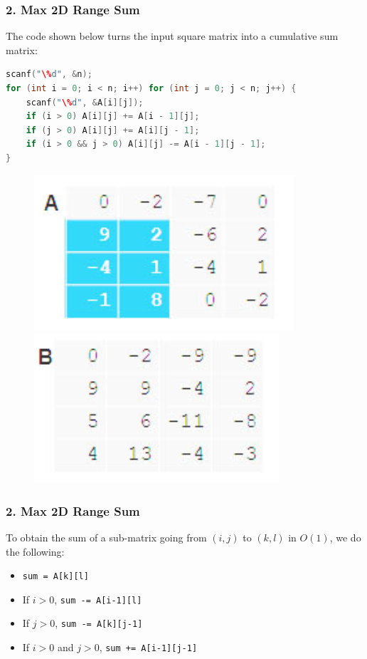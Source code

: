 \documentclass{beamer}
\begin{document}
\begin{frame}[fragile]
\frametitle{2. Max 2D Range Sum}

The code shown below turns the input square matrix into a cumulative sum matrix:

\vspace{0.3cm}

\begin{lstlisting}[language=c]
scanf("\%d", &n);
for (int i = 0; i < n; i++) for (int j = 0; j < n; j++) {
	scanf("\%d", &A[i][j]);
	if (i > 0) A[i][j] += A[i - 1][j];
	if (j > 0) A[i][j] += A[i][j - 1];
	if (i > 0 && j > 0) A[i][j] -= A[i - 1][j - 1];	
}\end{lstlisting}

\begin{figure}
    \centering
    \includegraphics[scale=0.6]{imgs/max2d_1.png}
    \hspace{0.5cm}
    \includegraphics[scale=0.6]{imgs/max2d_2.png}
\end{figure}

\end{frame}

\begin{frame}[fragile]
\frametitle{2. Max 2D Range Sum}

To obtain the sum of a sub-matrix going from $(i,j)$ to $(k,l)$ in $O(1)$, we do the following:

\begin{itemize}
	\item \verb|sum = A[k][l]|
    \item If $i>0$, \verb|sum -= A[i-1][l]|
    \item If $j > 0$, \verb|sum -= A[k][j-1]|
    \item If $i>0$ and $j>0$, \verb|sum += A[i-1][j-1]|
\end{itemize}

\end{frame}
\end{document}
